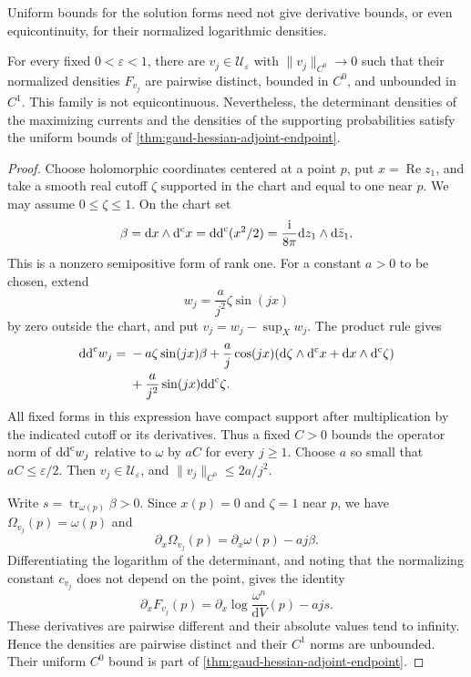 Uniform bounds for the solution forms need not give derivative bounds, or even equicontinuity, for their normalized logarithmic densities.

\begin{example}\label{ex:gaud-oscillatory-controlled-hessians}
For every fixed $0<\varepsilon<1$, there are $v_j\in\mathcal U_\varepsilon$ with $\|v_j\|_{C^0}\to0$ such that their normalized densities $F_{v_j}$ are pairwise distinct, bounded in $C^0$, and unbounded in $C^1$. This family is not equicontinuous. Nevertheless, the determinant densities of the maximizing currents and the densities of the supporting probabilities satisfy the uniform bounds of \cref{thm:gaud-hessian-adjoint-endpoint}.
\end{example}
\begin{proof}
Choose holomorphic coordinates centered at a point $p$, put $x=\operatorname{Re}z_1$, and take a smooth real cutoff $\zeta$ supported in the chart and equal to one near $p$. We may assume $0\leq\zeta\leq1$. On the chart set
\[
 \beta=\mathrm dx\wedge\mathrm d^{\mathrm c} x=\mathrm{dd}^{\mathrm{c}}(x^2/2)
       =\frac{\mathrm i}{8\pi}\mathrm dz_1\wedge\mathrm d\bar z_1.
\]
This is a nonzero semipositive form of rank one. For a constant $a>0$ to be chosen, extend
\[
 w_j=\frac a{j^2}\zeta\sin(jx)
\]
by zero outside the chart, and put $v_j=w_j-\sup_Xw_j$. The product rule gives
\begin{align*}
 \mathrm{dd}^{\mathrm{c}} w_j={}&-a\zeta\sin(jx)\beta
       +\frac a j\cos(jx)
          (\mathrm d\zeta\wedge\mathrm d^{\mathrm c} x+\mathrm dx\wedge\mathrm d^{\mathrm c}\zeta)\\
       &+\frac a{j^2}\sin(jx)\mathrm{dd}^{\mathrm{c}}\zeta.
\end{align*}
All fixed forms in this expression have compact support after multiplication by the indicated cutoff or its derivatives. Thus a fixed $C>0$ bounds the operator norm of $\mathrm{dd}^{\mathrm{c}} w_j$ relative to $\omega$ by $aC$ for every $j\geq1$. Choose $a$ so small that $aC\leq\varepsilon/2$. Then $v_j\in\mathcal U_\varepsilon$, and $\|v_j\|_{C^0}\leq2a/j^2$.

Write $s=\operatorname{tr}_{\omega(p)}\beta>0$. Since $x(p)=0$ and $\zeta=1$ near $p$, we have $\Omega_{v_j}(p)=\omega(p)$ and
\[
 \partial_x\Omega_{v_j}(p)=\partial_x\omega(p)-aj\beta.
\]
Differentiating the logarithm of the determinant, and noting that the normalizing constant $c_{v_j}$ does not depend on the point, gives the identity
\[
 \partial_xF_{v_j}(p)
   =\partial_x\log\frac{\omega^n}{\mathrm{d}V}(p)-ajs.
\]
These derivatives are pairwise different and their absolute values tend to infinity. Hence the densities are pairwise distinct and their $C^1$ norms are unbounded. Their uniform $C^0$ bound is part of \cref{thm:gaud-hessian-adjoint-endpoint}.


\end{proof}
